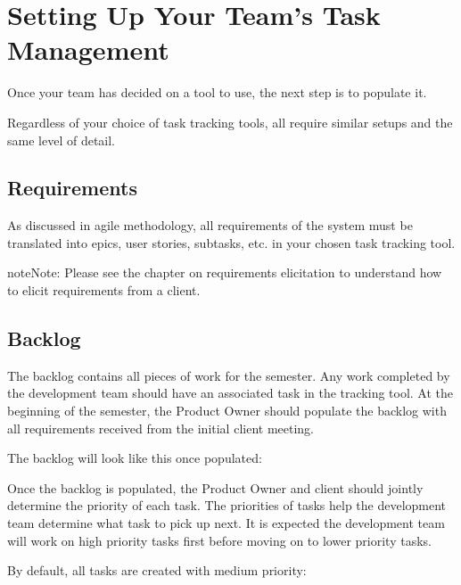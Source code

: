 \documentclass[letterpaper,10pt,english]{jupyterBook}
\begin{document}
\section{Setting Up Your Team’s Task Management}
\label{\detokenize{chapter_3/task_tracking:setting-up-your-team-s-task-management}}
\sphinxAtStartPar
Once your team has decided on a tool to use, the next step is to
populate it.

\sphinxAtStartPar
Regardless of your choice of task tracking tools, all require similar
set\sphinxhyphen{}ups and the same level of detail.


\subsection{Requirements}
\label{\detokenize{chapter_3/task_tracking:requirements}}
\sphinxAtStartPar
As discussed in agile methodology, all requirements of the system must
be translated into epics, user stories, subtasks, etc. in your chosen
task tracking tool.

\begin{sphinxadmonition}{note}{Note:}
\sphinxAtStartPar
Please see the chapter on requirements elicitation to understand how to elicit requirements from a client.
\end{sphinxadmonition}


\subsection{Backlog}
\label{\detokenize{chapter_3/task_tracking:backlog}}
\sphinxAtStartPar
The backlog contains all pieces of work for the semester. Any work
completed by the development team should have an associated task in the
tracking tool. At the beginning of the semester, the Product Owner
should populate the backlog with all requirements received from the
initial client meeting.

\sphinxAtStartPar
The backlog will look like this once populated:

\sphinxAtStartPar
{}

\sphinxAtStartPar
Once the backlog is populated, the Product Owner and client should
jointly determine the priority of each task. The priorities of tasks
help the development team determine what task to pick up next. It is
expected the development team will work on high priority tasks first
before moving on to lower priority tasks.

\sphinxAtStartPar
By default, all tasks are created with medium priority:
\end{document}
